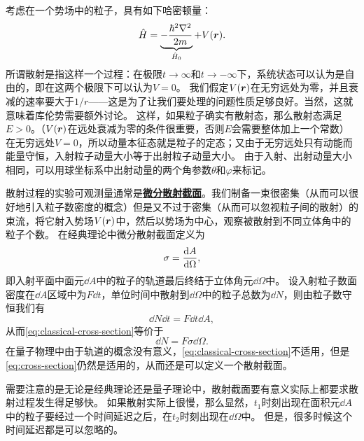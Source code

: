 \documentclass[UTF8, a4paper]{ctexart}
\newcommand{\concept}[1]{\underline{\textbf{#1}}}
\begin{document}
考虑在一个势场中的粒子，具有如下哈密顿量：
\begin{equation}
    \hat{H} = \underbrace{- \frac{\hbar^2 \laplacian}{2m}}_{\hat{H}_0} + V(\vb*{r}).
\end{equation}
所谓散射是指这样一个过程：在极限$t\to \infty$和$t \to -\infty$下，系统状态可以认为是自由的，即在这两个极限下可以认为$V=0$。
我们假定$V(\vb*{r})$在无穷远处为零，并且衰减的速率要大于$1/r$——这是为了让我们要处理的问题性质足够良好。当然，这就意味着库伦势需要额外讨论。
这样，如果粒子确实有散射态，那么散射态满足$E > 0$。（$V(\vb*{r})$在远处衰减为零的条件很重要，否则$E$会需要整体加上一个常数）
在无穷远处$V=0$，所以动量本征态就是粒子的定态；又由于无穷远处只有动能而能量守恒，入射粒子动量大小等于出射粒子动量大小。
由于入射、出射动量大小相同，可以用球坐标系中出射动量的两个角参数$\theta$和$\varphi$来标记。

散射过程的实验可观测量通常是\concept{微分散射截面}。我们制备一束很密集（从而可以很好地引入粒子数密度的概念）但是又不过于密集（从而可以忽视粒子间的散射）的束流，将它射入势场$V(\vb*{r})$中，然后以势场为中心，观察被散射到不同立体角中的粒子个数。
在经典理论中微分散射截面定义为
\begin{equation}
    \sigma = \dv{A}{\Omega},
    \label{eq:classical-cross-section}
\end{equation}
即入射平面中面元$\dd{A}$中的粒子的轨道最后终结于立体角元$\dd{\Omega}$中。
设入射粒子数面密度在$\dd{A}$区域中为$F \dd{t}$，单位时间中散射到$\dd{\Omega}$中的粒子总数为$\dd{N}$，则由粒子数守恒我们有
\[
    \dd{N} \dd{t} = F \dd{t} \dd{A},
\]
从而\eqref{eq:classical-cross-section}等价于
\begin{equation}
    \dd{N} = F \sigma \dd{\Omega}.
    \label{eq:cross-section}
\end{equation}
在量子物理中由于轨道的概念没有意义，\eqref{eq:classical-cross-section}不适用，但是\eqref{eq:cross-section}仍然是适用的，从而还是可以定义一个散射截面。

需要注意的是无论是经典理论还是量子理论中，散射截面要有意义实际上都要求散射过程发生得足够快。
如果散射实际上很慢，那么显然，$t_1$时刻出现在面积元$\dd{A}$中的粒子要经过一个时间延迟之后，在$t_2$时刻出现在$\dd{\Omega}$中。
但是，很多时候这个时间延迟都是可以忽略的。
\end{document}
